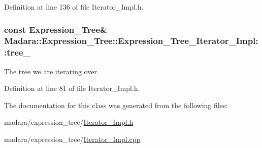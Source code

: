 Definition at line 136 of file Iterator\_\-Impl.h.

\hypertarget{classMadara_1_1Expression__Tree_1_1Expression__Tree__Iterator__Impl_a4b369e3fcfc62405321ece1d46719f93}{
\subsubsection[{tree\_\-}]{\setlength{\rightskip}{0pt plus 5cm}const {\bf Expression\_\-Tree}\& {\bf Madara::Expression\_\-Tree::Expression\_\-Tree\_\-Iterator\_\-Impl::tree\_\-}}}
\label{d0/dd7/classMadara_1_1Expression__Tree_1_1Expression__Tree__Iterator__Impl_a4b369e3fcfc62405321ece1d46719f93}


The tree we are iterating over. 



Definition at line 81 of file Iterator\_\-Impl.h.



The documentation for this class was generated from the following files:\begin{DoxyCompactItemize}
\item 
madara/expression\_\-tree/\hyperlink{Iterator__Impl_8h}{Iterator\_\-Impl.h}\item 
madara/expression\_\-tree/\hyperlink{Iterator__Impl_8cpp}{Iterator\_\-Impl.cpp}\end{DoxyCompactItemize}
